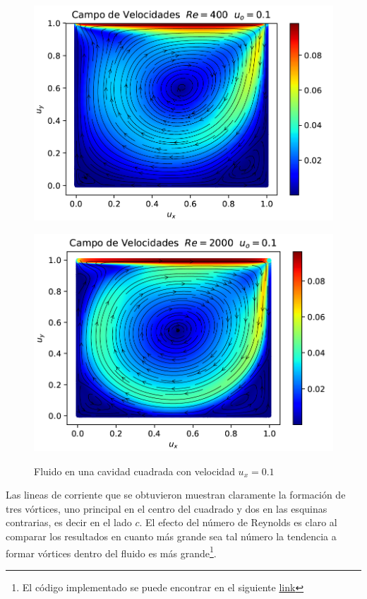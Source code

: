 \begin{figure}[H]
\label{fig:Cavidad}
  \centering
  \begin{minipage}[b]{0.4\textwidth}
    \label{cavidadRe400}
    \includegraphics[scale =0.25]{cavidadRE400.png}
  \end{minipage}
  \hspace{1cm}
  \begin{minipage}[b]{0.4\textwidth}
  \label{cavidadRe2000}
    \includegraphics[scale=0.25]{cavidadRE200.png}
  \end{minipage}
  \caption{Fluido en una cavidad cuadrada con velocidad $u_{x} = 0.1$}
\end{figure}

Las lineas de corriente que se obtuvieron muestran claramente la formación de tres vórtices, uno principal en el centro del cuadrado y dos en las esquinas contrarias, es decir en el lado $c$. El efecto del número de Reynolds es claro al comparar los resultados en cuanto más grande sea tal número la tendencia a formar vórtices dentro del fluido es más grande\footnote{El código implementado se puede encontrar en el siguiente \href{https://github.com/jomen93/Cavidad_2D}{link}}.



